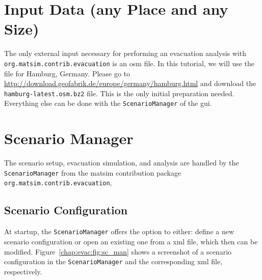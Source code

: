 \section{Input Data (any Place and any Size)}
\label{grips:input}
The only external input necessary for performing an evacuation analysis with \lstinline|org.matsim.contrib.evacuation| is an \gls{osm} file.
In this tutorial, we will use the file for Hamburg, Germany. Please go to \url{http://download.geofabrik.de/europe/germany/hamburg.html} and download the \lstinline|hamburg-latest.osm.bz2| file. This is the only initial preparation needed. Everything else can be done with the \lstinline|ScenarioManager| of the \gls{gui}.

\section{Scenario Manager}
\label{grips:scm}
The scenario setup, evacuation simulation, and analysis are handled by the \lstinline|ScenarioManager| from the \gls{matsim} contribution package \lstinline|org.matsim.contrib.evacuation|, 
\subsection{Scenario Configuration}
At startup, the \lstinline|ScenarioManager| offers the option to either: define a new scenario configuration or open an existing one from a \gls{xml} file, which then can be modified. Figure~\ref{chap:evac:fig:sc_man} shows a screenshot of a scenario configuration in the \lstinline|ScenarioManager| and the corresponding \gls{xml} file, respectively.

